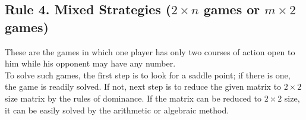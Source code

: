 \documentclass[../main-sheet.tex]{subfiles}
\begin{document}
    \subsection{Rule 4. Mixed Strategies (\(2\times n\) games or \(m\times 2\) games)}
    These are the games in which one player has only two courses of action open to him while his opponent may have any number.\\
    To  solve  such  games,  the  first  step  is  to  look  for  a  saddle  point;  if  there  is  one,  the game  is  readily  solved.  If  not,  next  step  is  to  reduce  the  given  matrix  to \(2\times 2\)  size 
matrix by the rules of dominance. If the matrix can be reduced to \(2\times 2\) size, it can be 
easily solved by the arithmetic or algebraic method.
\end{document}

